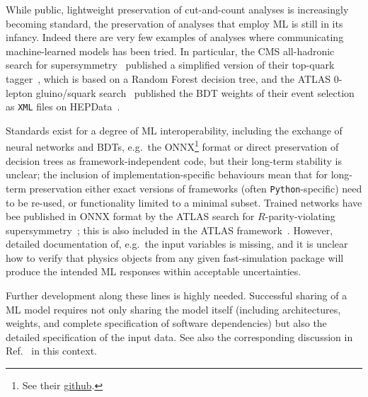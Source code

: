 \documentclass[11pt]{article}
\begin{document}
While public, lightweight preservation of cut-and-count analyses is increasingly becoming standard, the preservation of analyses that employ \gls{ML} is still in its infancy. 
Indeed there are very few examples of analyses where communicating machine-learned models has been tried. In particular, the \gls{CMS} all-hadronic search for supersymmetry~\cite{CMS:2017qxu} published a simplified version of their top-quark tagger~\cite{cms:toptagger}, which is based on a Random Forest decision tree, and the \gls{ATLAS} 0-lepton gluino/squark search~\cite{ATLAS:2020syg,Uno:2763449} published the \gls{BDT} weights of their event selection as \texttt{XML} files on HEPData~\cite{hepdata.95664.v2/r8}.  

Standards exist for a degree of \gls{ML} interoperability, including the exchange of neural networks and \glspl{BDT}, e.g.~the 
\gls{ONNX}\footnote{See their \href{https://github.com/onnx}{github}.} format or direct preservation of decision trees as framework-independent code, but their long-term stability is unclear; the inclusion of implementation-specific behaviours mean that for long-term preservation either exact versions of frameworks (often \texttt{Python}-specific) need to be re-used, or functionality limited to a minimal subset. Trained networks have bee published in \gls{ONNX} format by the \gls{ATLAS} search for $R$-parity-violating supersymmetry~\cite{ATLAS:2021fbt,hepdata.104860.v1/r3}; this is also included in the \gls{ATLAS} \simpleanalysis framework~\cite{atlas:simpleanalysis}. 
However, detailed documentation of, e.g.~the input variables is missing, and it is unclear how to verify that physics objects from any given fast-simulation package will produce the intended \gls{ML} responses within acceptable uncertainties.

Further development along these lines is highly needed. Successful sharing of a \gls{ML} model requires not only sharing the model itself (including architectures, weights, and complete specification of software dependencies) but also the detailed specification of the input data. See also the corresponding discussion in Ref.~\cite{snowmass:MLevts} in this context.



\end{document}
